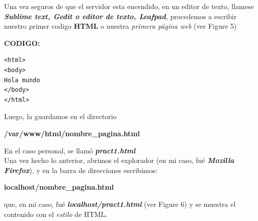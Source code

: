 \documentclass[12pt,letterpaper]{article}
\begin{document}
\begin{flushleft}
\vspace{3cm}
Una vez seguros de que el servidor esta encendido, en un editor de texto, llamese {\em {\bf Sublime text, Gedit o editor de texto, Leafpad}}, procedemos a escribir nuestro primer codigo {\bf HTML} o nuestra {\em primera p\'agina web} (ver Figure 5)%
\begin{center}
\fboxsep 12pt
{\bf CODIGO: \\}
\begin{verbatim}
<html>
<body>
Hola mundo
</body>
</html>
\end{verbatim}
\end{center}
\end{flushleft}

Luego, la guardamos en el directorio
\begin{center}

\begin{minipage}[t]{6cm}
\fboxsep 12pt
{\bf /var/www/html/nombre\_pagina.html}
\end{minipage}
\end{center}
En el caso personal, se llam\'o {\bf {\em pract1.html}}\\
Una vez hecho lo anterior, abrimos el explorador (en mi caso, fu\'e {\bf {\em Mozilla Firefox}}), y en la barra de direcciones escribimos: 
\begin{center}
\begin{minipage}[t]{6cm}
\fboxsep 12pt
{\bf localhost/nombre\_pagina.html}
\end{minipage}
\end{center}
que, en mi caso, fu\'e {\bf {\em localhost/pract1.html}} (ver Figure 6) y se muestra el contenido con el {\em estilo} de HTML.
\newpage
\end{document}
